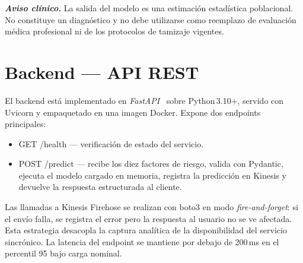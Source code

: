 \documentclass[conference,a4paper,10pt]{IEEEtran}
\newcommand{\code}[1]{{\ttfamily\small\textcolor{hai-primary-dark}{#1}}}
\begin{document}
\begin{warning}
\textbf{\itshape Aviso clínico.} La salida del modelo es una estimación
estadística poblacional. No constituye un diagnóstico y no debe
utilizarse como reemplazo de evaluación médica profesional ni de los
protocolos de tamizaje vigentes.
\end{warning}

\section{Backend --- API REST}\label{sec:backend}
El backend está implementado en \emph{FastAPI}~\cite{fastapi} sobre
Python\,3.10+, servido con Uvicorn y empaquetado en una imagen Docker.
Expone dos endpoints principales:
\begin{itemize}[leftmargin=*,nosep]
  \item \code{GET /health} --- verificación de estado del servicio.
  \item \code{POST /predict} --- recibe los diez factores de riesgo,
  valida con Pydantic, ejecuta el modelo cargado en memoria, registra la
  predicción en Kinesis y devuelve la respuesta estructurada al cliente.
\end{itemize}
Las llamadas a Kinesis Firehose se realizan con \code{boto3} en modo
\emph{fire-and-forget}: si el envío falla, se registra el error pero la
respuesta al usuario no se ve afectada. Esta estrategia desacopla la
captura analítica de la disponibilidad del servicio sincrónico. La
latencia del endpoint se mantiene por debajo de 200\,ms en el percentil
95 bajo carga nominal.

\end{document}
